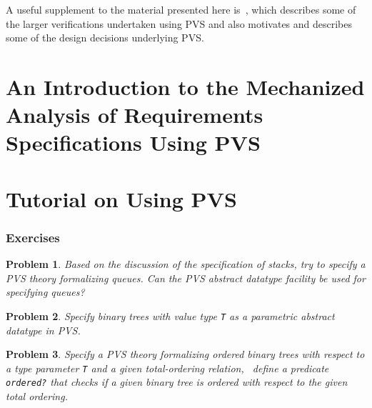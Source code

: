 \documentclass[11pt,part]{article}
\begin{document}
A useful supplement to the material presented here
is~\cite{Owre95:prolegomena}, which describes some of the larger
verifications undertaken using PVS and also motivates and describes
some of the design decisions underlying PVS.

\part[Introduction to Mechanized Analysis of
Specifications Using PVS]{An Introduction to the Mechanized Analysis of
Requirements Specifications Using PVS}
\cleardoublepage
{}

\newpage
\thispagestyle{plain}


\setcounter{section}{0}
\part{Tutorial on Using PVS}
\cleardoublepage







\section{Exercises}

\newtheorem{prob}{Problem}

\begin{prob}
Based on the discussion of the specification of stacks, try to specify a
PVS theory formalizing queues.  Can the PVS abstract datatype facility
be used for specifying queues?
\end{prob}

\begin{prob}
Specify binary trees with value type {\tt T} as a parametric abstract
datatype in PVS.
\end{prob}

\begin{prob}
Specify a PVS theory formalizing {\em ordered\/} binary trees with respect to a
type parameter {\tt T} and a given total-ordering relation, \ie\ define
a predicate {\tt ordered?} that checks if a given binary tree is ordered
with respect to the given total ordering.
\end{prob}
\end{document}
